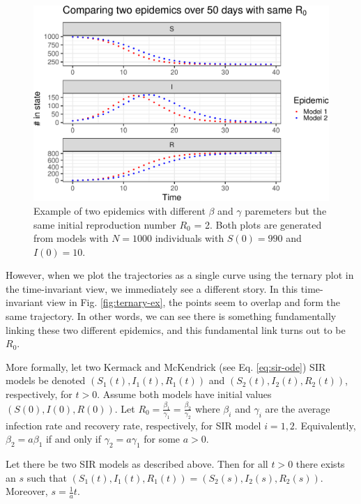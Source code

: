 \documentclass[
  shortnames]{jss}
\begin{document}
\begin{CodeChunk}
\begin{figure}[H]

{\centering \includegraphics{Figs/unnamed-chunk-2-1} 

}

\caption{\label{fig:sir-ex}Example of two epidemics with different $\beta$ and $\gamma$ paremeters but the same initial reproduction number $R_0$ = 2.  Both plots are generated from models with $N= 1000$ individuals with $S(0) = 990$ and $I(0) = 10$.}\label{fig:unnamed-chunk-2}
\end{figure}
\end{CodeChunk}

However, when we plot the trajectories as a single curve using the
ternary plot in the time-invariant view, we immediately see a different
story. In this time-invariant view in Fig. \ref{fig:ternary-ex}, the
points seem to overlap and form the same trajectory. In other words, we
can see there is something fundamentally linking these two different
epidemics, and this fundamental link turns out to be \(R_0\).

More formally, let two Kermack and McKendrick (see Eq.
\eqref{eq:sir-ode}) SIR models be denoted \((S_1(t), I_1(t), R_1(t))\)
and \((S_2(t), I_2(t), R_2(t))\), respectively, for \(t > 0\). Assume
both models have initial values \((S(0), I(0), R(0))\). Let
\(R_0 = \frac{\beta_1}{\gamma_1} = \frac{\beta_2}{\gamma_2}\) where
\(\beta_i\) and \(\gamma_i\) are the average infection rate and recovery
rate, respectively, for SIR model \(i=1, 2\). Equivalently,
\(\beta_2 = a \beta_1\) if and only if \(\gamma_2 = a \gamma_1\) for
some \(a > 0\).

\begin{theorem}\label{thm:sir-scale}
Let there be two SIR models as described above.  Then for all $t > 0$ there exists an $s$ such that $(S_1(t), I_1(t), R_1(t)) = (S_2(s), I_2(s), R_2(s))$.  Moreover, $s = \frac{1}{a}t$.
\end{theorem}
\end{document}
